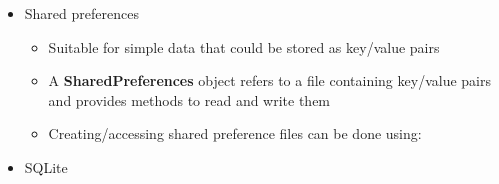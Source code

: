 \begin{itemize}
	\item Shared preferences
	\begin{itemize}
		\item Suitable for simple data that could be stored as key/value pairs
		\item A \textbf{SharedPreferences} object refers to a file containing key/value pairs and provides methods to read and write them
		\item Creating/accessing shared preference files can be done using:
	\end{itemize}

	\item SQLite


\end{itemize}
